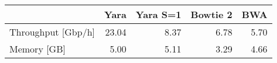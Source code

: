 \begin{tabular}{lrrrr}
  \toprule
 & Yara & Yara S=1 & Bowtie 2 & BWA \\ 
  \midrule
Throughput [Gbp/h] & 23.04 & 8.37 & 6.78 & 5.70 \\ 
  Memory [GB] & 5.00 & 5.11 & 3.29 & 4.66 \\ 
   \bottomrule
\end{tabular}
